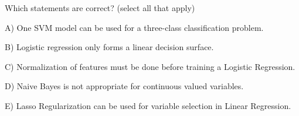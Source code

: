 Which statements are correct? (select all that apply)


A) One SVM model can be used for a three-class classification problem.


B) Logistic regression only forms a linear decision surface.


C) Normalization of features must be done before training a Logistic Regression.


D) Naive Bayes is not appropriate for continuous valued variables.


E) Lasso Regularization can be used for variable selection in Linear Regression.
